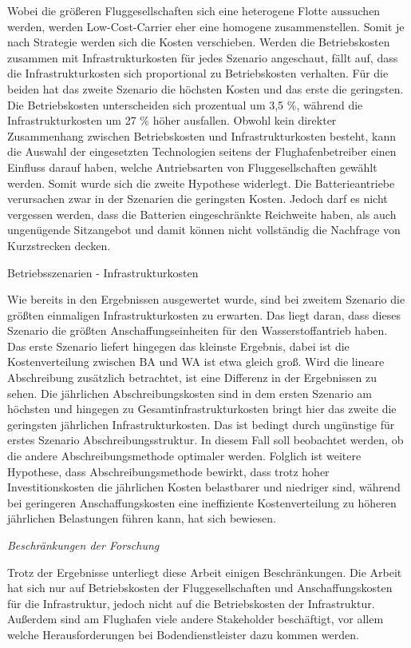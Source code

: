 Wobei die größeren Fluggesellschaften sich eine heterogene Flotte aussuchen werden, werden Low-Cost-Carrier eher eine homogene zusammenstellen.
Somit je nach Strategie werden sich die Kosten verschieben.
Werden die Betriebskosten zusammen mit Infrastrukturkosten für jedes Szenario angeschaut, fällt auf, dass die Infrastrukturkosten sich proportional 
zu Betriebskosten verhalten. Für die beiden hat das zweite Szenario die höchsten Kosten und das erste die geringsten. 
Die Betriebskosten unterscheiden sich prozentual um 3,5 \%, während die Infrastrukturkosten um 27 \% höher ausfallen.
Obwohl kein direkter Zusammenhang zwischen Betriebskosten und Infrastrukturkosten besteht, 
kann die Auswahl der eingesetzten Technologien seitens der Flughafenbetreiber einen Einfluss darauf haben, 
welche Antriebsarten von Fluggesellschaften gewählt werden. Somit wurde sich die zweite Hypothese widerlegt.
Die Batterieantriebe verursachen zwar in der Szenarien die geringsten Kosten. 
Jedoch darf es nicht vergessen werden, dass die Batterien eingeschränkte Reichweite haben, als auch
ungenügende Sitzangebot und damit können nicht vollständig die Nachfrage von Kurzstrecken decken.

Betriebsszenarien - Infrastrukturkosten

Wie bereits in den Ergebnissen ausgewertet wurde, sind bei zweitem Szenario die größten einmaligen Infrastrukturkosten zu erwarten.
Das liegt daran, dass dieses Szenario die größten Anschaffungseinheiten für den Wasserstoffantrieb haben. Das erste Szenario liefert
hingegen das kleinste Ergebnis, dabei ist die Kostenverteilung zwischen BA und WA ist etwa gleich groß.
Wird die lineare Abschreibung zusätzlich betrachtet, ist eine Differenz in der Ergebnissen zu sehen. 
Die jährlichen Abschreibungskosten
sind in dem ersten Szenario am höchsten und hingegen zu Gesamtinfrastrukturkosten bringt hier das zweite die geringsten jährlichen Infrastrukturkosten.
Das ist bedingt durch ungünstige für erstes Szenario Abschreibungsstruktur. In diesem Fall soll beobachtet werden, ob die andere Abschreibungsmethode optimaler werden.
Folglich ist weitere Hypothese, dass Abschreibungsmethode bewirkt, dass trotz hoher Investitionskosten die jährlichen Kosten belastbarer 
und niedriger sind, während bei geringeren Anschaffungskosten eine ineffiziente Kostenverteilung zu 
höheren jährlichen Belastungen führen kann, hat sich bewiesen.

\textit{Beschränkungen der Forschung}

Trotz der Ergebnisse unterliegt diese Arbeit einigen Beschränkungen. %
Die Arbeit hat sich nur auf Betriebskosten der Fluggesellschaften und Anschaffungskosten für die Infrastruktur,
jedoch nicht auf die Betriebskosten der Infrastruktur. Außerdem sind am Flughafen viele andere Stakeholder beschäftigt, vor allem
welche Herausforderungen bei Bodendienstleister dazu kommen werden.

